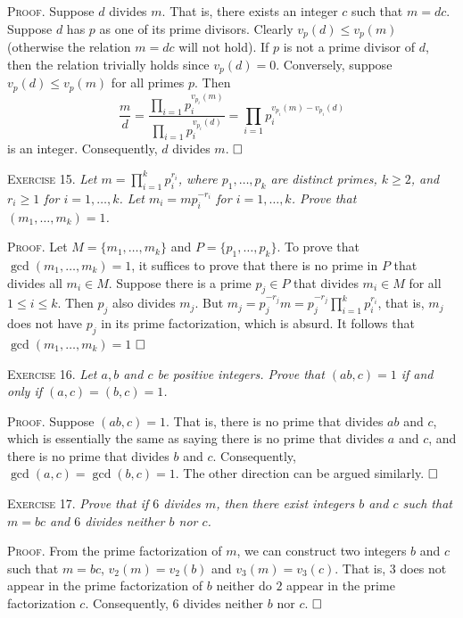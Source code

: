 \documentclass[11pt, leqno]{article}
\newcommand{\done}{\ensuremath{\hfill\square}}
\begin{document}
\textsc{Proof}. Suppose $d$ divides $m$. That is, there exists an integer $c$ such that $m = dc$. Suppose $d$ has $p$ as one of its prime divisors. Clearly $v_p(d) \leq v_p(m)$ (otherwise the relation $m=dc$ will not hold). If $p$ is not a prime divisor of $d$, then the relation trivially holds since $v_p(d) = 0$. Conversely, suppose $v_p(d) \leq v_p(m)$ for all primes $p$. Then 
\begin{displaymath}
\frac{m}{d} = \frac{\prod_{i=1}p_i^{v_{p_i}(m)}}{\prod_{i=1}p_i^{v_{p_i}(d)}} = \prod_{i=1} p_i^{v_{p_i}(m)-v_{p_i}(d)}
\end{displaymath}
is an integer. Consequently, $d$ divides $m$. \done

\textsc{Exercise 15}. \emph{Let $m = \prod_{i=1}^k p_i^{r_i}$, where $p_1, \ldots, p_k$ are distinct primes, $k \geq 2$, and $r_i\geq 1$ for $i=1,\ldots, k$. Let $m_i = mp_i^{-r_i}$ for $i=1,\ldots, k$. Prove that $(m_1, \ldots, m_k) = 1$.}

\textsc{Proof}. Let $M=\{m_1, \ldots, m_k\}$ and $P=\{ p_1, \ldots, p_k\}$. To prove that $\gcd(m_1, \ldots, m_k) = 1$, it suffices to prove that there is no prime in $P$ that divides all $m_i \in M$. Suppose there is a prime $p_j \in P$ that divides $m_i \in M$ for all $1\leq i \leq k$. Then $p_j$ also divides $m_j$. But $m_j = p_j^{-r_j}m = p_j^{-r_j} \prod_{i=1}^k p_i^{r_i} $, that is, $m_j$ does not have $p_j$ in its prime factorization, which is absurd. It follows that $\gcd(m_1, \ldots, m_k) = 1$ \done

\textsc{Exercise 16}. \emph{Let $a, b$ and $c$ be positive integers. Prove that $(ab, c)=1$ if and only if $(a,c) = (b,c) = 1$.}

\textsc{Proof}. Suppose $(ab, c) = 1$. That is, there is no prime that divides $ab$ and $c$, which is essentially the same as saying there is no prime that divides $a$ and $c$, and there is no prime that divides $b$ and $c$. Consequently, $\gcd(a,c) = \gcd(b,c) = 1$. The other direction can be argued similarly. \done

\textsc{Exercise 17}. \emph{Prove that if $6$ divides $m$, then there exist integers $b$ and $c$ such that $m=bc$ and $6$ divides neither $b$ nor $c$.}

\textsc{Proof}. From the prime factorization of $m$, we can construct two integers $b$ and $c$ such that $m=bc$, $v_2(m) = v_2(b)$ and $v_3(m) = v_3(c)$. That is, $3$ does not appear in the prime factorization of $b$ neither do $2$ appear in the prime factorization $c$. Consequently, $6$ divides neither $b$ nor $c$. \done
\end{document}
